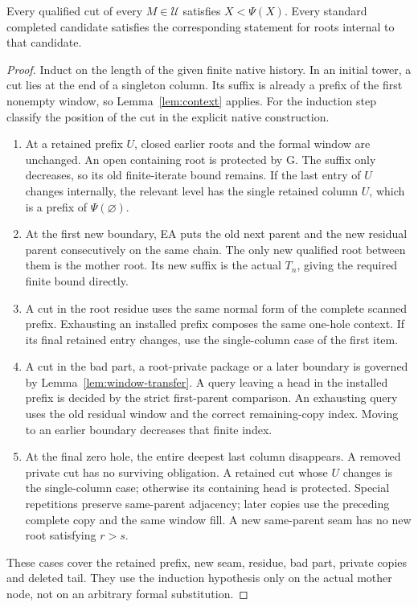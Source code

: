 \begin{proposition}\label{prop:sce}
Every qualified cut of every $M\in\mathscr U$ satisfies $X<\Psi(X)$.
Every standard completed candidate satisfies the corresponding statement
for roots internal to that candidate.
\end{proposition}
\begin{proof}
Induct on the length of the given finite native history. In an initial
tower, a cut lies at the end of a singleton column. Its suffix is
already a prefix of the first nonempty window, so
Lemma~\ref{lem:context} applies. For the induction step classify the
position of the cut in the explicit native construction.
\begin{enumerate}
\item At a retained prefix $U$, closed earlier roots and the formal
window are unchanged. An open containing root is protected by G. The
suffix only decreases, so its old finite-iterate bound remains. If the
last entry of $U$ changes internally, the relevant level has the single
retained column $U$, which is a prefix of $\Psi(\varnothing)$.
\item At the first new boundary, EA puts the old next parent and the
new residual parent consecutively on the same chain. The only new
qualified root between them is the mother root. Its new suffix is the
actual $T_n$, giving the required finite bound directly.
\item A cut in the root residue uses the same normal form of the
complete scanned prefix. Exhausting an installed prefix composes the
same one-hole context. If its final retained entry changes, use the
single-column case of the first item.
\item A cut in the bad part, a root-private package or a later boundary
is governed by Lemma~\ref{lem:window-transfer}. A query leaving a head
in the installed prefix is decided by the strict first-parent comparison.
An exhausting query uses the old residual window and the correct
remaining-copy index. Moving to an earlier boundary decreases that
finite index.
\item At the final zero hole, the entire deepest last column disappears.
A removed private cut has no surviving obligation. A retained cut
whose $U$ changes is the single-column case; otherwise its containing
head is protected. Special repetitions preserve same-parent adjacency;
later copies use the preceding complete copy and the same window fill.
A new same-parent seam has no new root satisfying $r>s$.
\end{enumerate}
These cases cover the retained prefix, new seam, residue, bad part,
private copies and deleted tail. They use the induction hypothesis only
on the actual mother node, not on an arbitrary formal substitution.


\end{proof}
